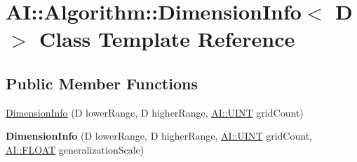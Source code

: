 \hypertarget{classAI_1_1Algorithm_1_1DimensionInfo}{\section{A\-I\-:\-:Algorithm\-:\-:Dimension\-Info$<$ D $>$ Class Template Reference}
\label{classAI_1_1Algorithm_1_1DimensionInfo}
}
\subsection*{Public Member Functions}
\begin{DoxyCompactItemize}
\item 
\hyperlink{classAI_1_1Algorithm_1_1DimensionInfo_a81474f419c3763f3de2833c8edb378c4}{Dimension\-Info} (D lower\-Range, D higher\-Range, \hyperlink{namespaceAI_ab6e14dc1e659854858a87e511f1439ec}{A\-I\-::\-U\-I\-N\-T} grid\-Count)
\item 
\hypertarget{classAI_1_1Algorithm_1_1DimensionInfo_a1401520e0bfb6e50b064ab0d94b8d5ec}{{\bfseries Dimension\-Info} (D lower\-Range, D higher\-Range, \hyperlink{namespaceAI_ab6e14dc1e659854858a87e511f1439ec}{A\-I\-::\-U\-I\-N\-T} grid\-Count, \hyperlink{namespaceAI_a41b74884a20833db653dded3918e05c3}{A\-I\-::\-F\-L\-O\-A\-T} generalization\-Scale)}\label{classAI_1_1Algorithm_1_1DimensionInfo_a1401520e0bfb6e50b064ab0d94b8d5ec}


\end{DoxyCompactItemize}
